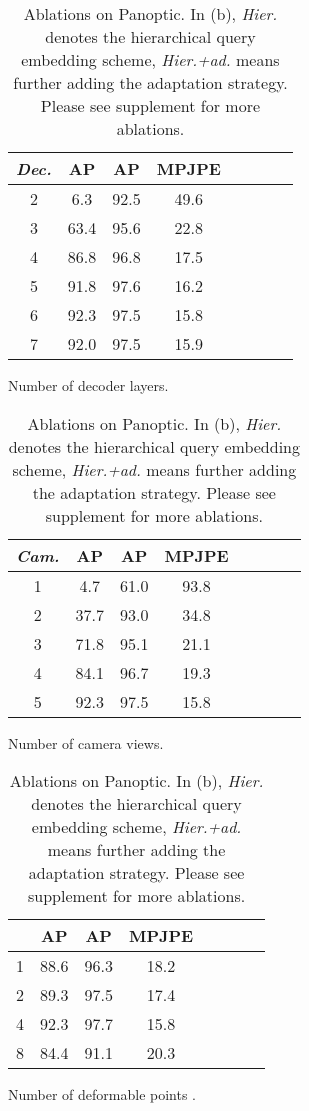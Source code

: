 \documentclass{article}
\begin{document}
\begin{table}[t]
\begin{subtable}[b]{0.32\textwidth}
		\centering
		\begin{tabular}{cccccccc}
			\toprule
			\textit{Dec.} & AP & AP & MPJPE \\
			\midrule
2 & 6.3 & 92.5 & 49.6\\
			3 & 63.4 & 95.6 & 22.8\\
			4 & 86.8 & 96.8& 17.5\\
			5 & 91.8 & 97.6 & 16.2\\
			6 & 92.3 & 97.5 & 15.8\\
			7 & 92.0 & 97.5 & 15.9\\
			\bottomrule
		\end{tabular}
		\caption{Number of decoder layers. 
}
		\label{ablation:decoder_layer}
	\end{subtable}
	\hspace{\fill}
	\begin{subtable}[b]{0.32\textwidth}
		\centering
		\begin{tabular}{cccccccc}
			\toprule
			\textit{Cam.} & AP & AP & MPJPE \\
			\midrule
			1 & 4.7 & 61.0 & 93.8\\
			2 & 37.7 & 93.0 & 34.8\\
			3 & 71.8 & 95.1 & 21.1\\
			4 & 84.1 & 96.7 & 19.3\\
			5 & 92.3 & 97.5 & 15.8\\
			\bottomrule
		\end{tabular}
		\caption{Number of camera views. 
}
		\label{ablation:camera_view}
	\end{subtable}
	\hspace{\fill}
	\begin{subtable}[b]{0.32\textwidth}
		\centering
		\begin{tabular}{cccccccc}
			\toprule
			 & AP & AP &  MPJPE \\
			\midrule
			1 & 88.6 & 96.3 & 18.2\\
			2 & 89.3 & 97.5 & 17.4\\
			4 & 92.3 & 97.7 & 15.8\\
			8 & 84.4 & 91.1 & 20.3\\
			\bottomrule
		\end{tabular}
		\caption{Number of deformable points . 
}
		\label{ablation:deform_points}
	\end{subtable}
	\hspace{\fill}
	\caption{Ablations on Panoptic. In (b), \textit{Hier.} denotes the hierarchical query embedding scheme, \textit{Hier.+ad.} means further adding the adaptation strategy. Please see supplement for more ablations.}
	\label{ablations}
\end{table}
\end{document}
